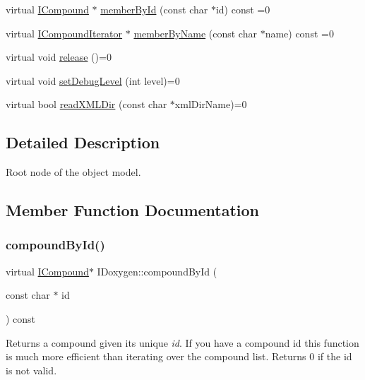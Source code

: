 \begin{DoxyCompactItemize}
\item 
virtual \mbox{\hyperlink{class_i_compound}{I\+Compound}} $\ast$ \mbox{\hyperlink{class_i_doxygen_ac7544d8d1dd53c3a8d1e180d81bca0e9}{member\+By\+Id}} (const char $\ast$id) const =0
\item 
virtual \mbox{\hyperlink{class_i_compound_iterator}{I\+Compound\+Iterator}} $\ast$ \mbox{\hyperlink{class_i_doxygen_a1895a0347469d6e4788da0beca0e071c}{member\+By\+Name}} (const char $\ast$name) const =0
\item 
virtual void \mbox{\hyperlink{class_i_doxygen_a6865961012ad8e6c19b7575488046045}{release}} ()=0
\item 
virtual void \mbox{\hyperlink{class_i_doxygen_ae8e3759ffc6d64684dc500855f6fead6}{set\+Debug\+Level}} (int level)=0
\item 
virtual bool \mbox{\hyperlink{class_i_doxygen_a7959d93fba77caddee37b6d8370c10f0}{read\+X\+M\+L\+Dir}} (const char $\ast$xml\+Dir\+Name)=0
\end{DoxyCompactItemize}


\subsection{Detailed Description}
Root node of the object model. 

\subsection{Member Function Documentation}
\mbox{\label{class_i_doxygen_aec9e0df2a3c6a8085358ff0f07c52c55}} 
\subsubsection{\texorpdfstring{compoundById()}{compoundById()}\hspace{0.1cm}{\footnotesize\ttfamily [1/2]}}
{\footnotesize\ttfamily virtual \mbox{\hyperlink{class_i_compound}{I\+Compound}}$\ast$ I\+Doxygen\+::compound\+By\+Id (\begin{DoxyParamCaption}\item[{const char $\ast$}]{id }\end{DoxyParamCaption}) const\hspace{0.3cm}{\ttfamily [pure virtual]}}

Returns a compound given its unique {\itshape id}. If you have a compound id this function is much more efficient than iterating over the compound list. Returns 0 if the id is not valid. 


